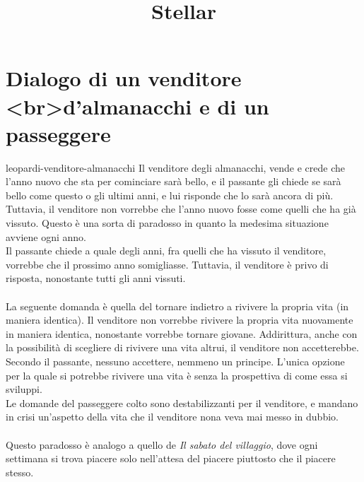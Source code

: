 \documentclass[preview]{standalone}
\begin{document}
\title{Stellar}
\genpage

\section{Dialogo di un venditore <br>d'almanacchi e di un passeggere}


\begin{snippet}{leopardi-venditore-almanacchi}
    Il venditore degli almanacchi, vende e crede che l'anno nuovo che sta per cominciare
    sarà bello, e il passante gli chiede se sarà bello come questo o gli ultimi anni, e
    lui risponde che lo sarà ancora di più. Tuttavia, il venditore non vorrebbe
    che l'anno nuovo fosse come quelli che ha già vissuto.
    Questo è una sorta di paradosso in quanto la medesima situazione avviene
    ogni anno.
    \\
    Il passante chiede a quale degli anni, fra quelli che ha vissuto il venditore, vorrebbe
    che il prossimo anno somigliasse.
    Tuttavia, il venditore è privo di risposta, nonostante tutti gli anni vissuti.
    \\\\
    La seguente domanda è quella del tornare indietro a rivivere la propria vita (in maniera identica).
    Il venditore non vorrebbe rivivere la propria vita nuovamente in maniera identica,
    nonostante vorrebbe tornare giovane.
    Addirittura, anche con la possibilità di scegliere di rivivere una vita altrui, il venditore
    non accetterebbe.
    Secondo il passante, nessuno accettere, nemmeno un principe.
    L'unica opzione per la quale si potrebbe rivivere una vita è senza la prospettiva di come
    essa si sviluppi.
    \\
    Le domande del passeggere colto sono destabilizzanti per il venditore, e mandano in crisi
    un'aspetto della vita che il venditore nona veva mai messo in dubbio.
    \\\\
    Questo paradosso è analogo a quello de \textit{Il sabato del villaggio}, 
    dove ogni settimana si trova piacere solo nell'attesa del piacere piuttosto
    che il piacere stesso.
    
\end{snippet}
\end{document}
